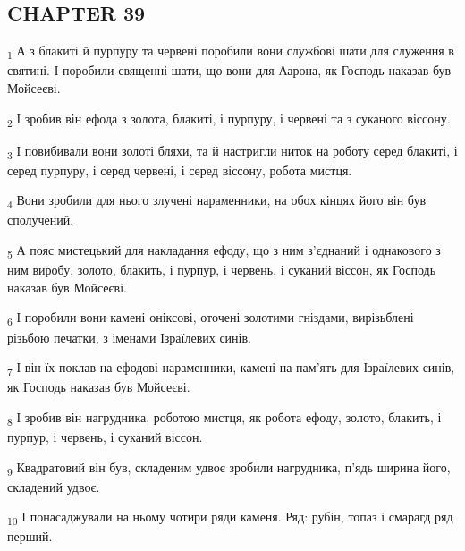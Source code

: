 \subsection{CHAPTER 39}
\begin{tcolorbox}
\textsubscript{1} А з блакиті й пурпуру та червені поробили вони службові шати для служення в святині. І поробили священні шати, що вони для Аарона, як Господь наказав був Мойсеєві.
\end{tcolorbox}
\begin{tcolorbox}
\textsubscript{2} І зробив він ефода з золота, блакиті, і пурпуру, і червені та з суканого віссону.
\end{tcolorbox}
\begin{tcolorbox}
\textsubscript{3} І повибивали вони золоті бляхи, та й настригли ниток на роботу серед блакиті, і серед пурпуру, і серед червені, і серед віссону, робота мистця.
\end{tcolorbox}
\begin{tcolorbox}
\textsubscript{4} Вони зробили для нього злучені нараменники, на обох кінцях його він був сполучений.
\end{tcolorbox}
\begin{tcolorbox}
\textsubscript{5} А пояс мистецький для накладання ефоду, що з ним з'єднаний і однакового з ним виробу, золото, блакить, і пурпур, і червень, і суканий віссон, як Господь наказав був Мойсеєві.
\end{tcolorbox}
\begin{tcolorbox}
\textsubscript{6} І поробили вони камені оніксові, оточені золотими гніздами, вирізьблені різьбою печатки, з іменами Ізраїлевих синів.
\end{tcolorbox}
\begin{tcolorbox}
\textsubscript{7} І він їх поклав на ефодові нараменники, камені на пам'ять для Ізраїлевих синів, як Господь наказав був Мойсеєві.
\end{tcolorbox}
\begin{tcolorbox}
\textsubscript{8} І зробив він нагрудника, роботою мистця, як робота ефоду, золото, блакить, і пурпур, і червень, і суканий віссон.
\end{tcolorbox}
\begin{tcolorbox}
\textsubscript{9} Квадратовий він був, складеним удвоє зробили нагрудника, п'ядь ширина його, складений удвоє.
\end{tcolorbox}
\begin{tcolorbox}
\textsubscript{10} І понасаджували на ньому чотири ряди каменя. Ряд: рубін, топаз і смарагд ряд перший.
\end{tcolorbox}
